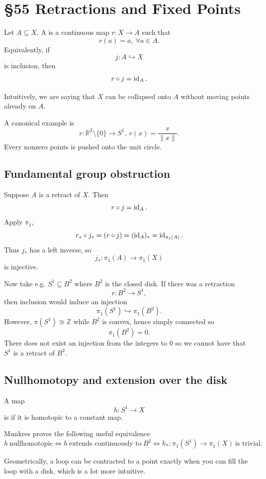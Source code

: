 \documentclass[11pt]{article}
\begin{document}
\section{\S55 Retractions and Fixed Points}
Let $A \subseteq X$. A  is a 
continuous map $r : X \to A$ such that 
\[
    r(a) = a, \ \forall a \in A. 
\]
Equivalently, if 
\[
    j : A \hookrightarrow X
\]
is inclusion, then 
\[
    r \circ j = \operatorname{id}_A.
\]

Intuitively, we are saying that $X$ can be 
collapsed onto $A$ without moving points already on $A$.  

A canonical example is 
\[
    r : \mathbb R^2 \setminus \{0\} 
    \to S^1, \ r(x) = \frac{x}{\|x\|}.
\]
Every nonzero points is pushed onto the unit circle. 

\subsection{Fundamental group obstruction}
Suppose $A$ is a retract of $X$. Then 
\[
    r \circ j = \operatorname{id}_A. 
\]
Apply $\pi_1$, 
\[
    r_* \circ j_* = (r \circ j) 
    = (\operatorname{id}_A)_* = \operatorname{id}_{\pi_1(A)}.
\]
Thus $j_*$ has a left inverse, so 
\[
    j_* : \pi_1(A) \to \pi_1(X) 
\]
is injective. 

Now take e.g. $S^1 \subseteq B^2$ where 
$B^2$ is the closed disk. 
If there was a retraction 
\[
    r : B^2 \to S^1, 
\]
then inclusion would induce an injection 
\[
    \pi_1(S^1) \hookrightarrow \pi_1(B^2).
\]
However, $\pi(S^1) \cong \mathbb Z$ while 
$B^2$ is convex, hence simply connected so 
\[
    \pi_1(B^2) = 0.
\]
There does not exist an injection from the integers to 
$0$ so we cannot have that $S^1$ is a retract of $B^2$.

\subsection{Nullhomotopy and 
extension over the disk}

A map 
\[
    h : S^1 \to X 
\]
is  if it 
is homotopic to a constant map. 

Munkres proves the following useful 
equivalence 
\[
    h \ \text{nullhomotopic} 
    \Leftrightarrow h \ \text{extends continuously to} 
    \ B^2 \Leftrightarrow h_* : \pi_1(S^1) 
    \to \pi_1(X) \ \text{is trivial.}
\]

Geometrically, a loop can be contracted 
to a point exactly when you can fill the loop 
with a disk, which is a lot more intuitive. 
\end{document}
